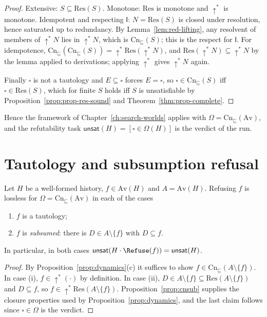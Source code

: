 \begin{proof}
Extensive: $S\subseteq\mathrm{Res}(S)$. Monotone: $\mathrm{Res}$ is monotone and $\uparrow^{\ast}$ is monotone. Idempotent and respecting $\mathsf I$: $N=\mathrm{Res}(S)$ is closed under resolution, hence saturated up to redundancy. By Lemma~\ref{lem:red-lifting}, any resolvent of members of $\uparrow^{\ast}\!N$ lies in $\uparrow^{\ast}\!N$, which is $\mathrm{Cn}_{\sqsubseteq}(S)$; this is the respect for $\mathsf I$. For idempotence, $\mathrm{Cn}_{\sqsubseteq}(\mathrm{Cn}_{\sqsubseteq}(S))=\uparrow^{\ast}\!\mathrm{Res}(\uparrow^{\ast}\!N)$, and $\mathrm{Res}(\uparrow^{\ast}\!N)\subseteq\uparrow^{\ast}\!N$ by the lemma applied to derivations; applying $\uparrow^{\ast}$ gives $\uparrow^{\ast}\!N$ again.

Finally $\square$ is not a tautology and $E\subseteq\square$ forces $E=\square$, so $\square\in\mathrm{Cn}_{\sqsubseteq}(S)$ iff $\square\in\mathrm{Res}(S)$, which for finite $S$ holds iff $S$ is unsatisfiable by Proposition~\ref{prop:prop-res-sound} and Theorem~\ref{thm:prop-complete}.
\end{proof}

Hence the framework of Chapter~\ref{ch:search-worlds} applies with $\Omega=\mathrm{Cn}_{\sqsubseteq}(\mathrm{Av})$, and the refutability task $\mathsf{unsat}(H)=[\square\in\Omega(H)]$ is the verdict of the run.

\section{Tautology and subsumption refusal}

\begin{theorem}
\label{thm:admissible-refusals}
Let $H$ be a well-formed history, $f\in\mathrm{Av}(H)$ and $A=\mathrm{Av}(H)$. Refusing $f$ is lossless for $\Omega=\mathrm{Cn}_{\sqsubseteq}(\mathrm{Av})$ in each of the cases
\begin{enumerate}[label=(\roman*),nosep]
\item $f$ is a tautology;
\item $f$ is \emph{subsumed}: there is $D\in A\setminus\{f\}$ with $D\subseteq f$.
\end{enumerate}
In particular, in both cases $\mathsf{unsat}(H\cdot\Refuse(f))=\mathsf{unsat}(H)$.
\end{theorem}

\begin{proof}
By Proposition~\ref{prop:dynamics}(c) it suffices to show $f\in\mathrm{Cn}_{\sqsubseteq}(A\setminus\{f\})$. In case (i), $f\in\uparrow^{\ast}\!(\cdot)$ by definition. In case (ii), $D\in A\setminus\{f\}\subseteq\mathrm{Res}(A\setminus\{f\})$ and $D\subseteq f$, so $f\in\uparrow^{\ast}\!\mathrm{Res}(A\setminus\{f\})$. Proposition~\ref{prop:cnsub} supplies the closure properties used by Proposition~\ref{prop:dynamics}, and the last claim follows since $\square\in\Omega$ is the verdict.
\end{proof}

